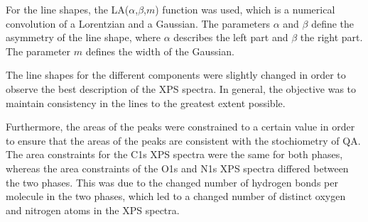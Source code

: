 For the line shapes, the LA($\alpha$,$\beta$,$m$) function was used, which is a numerical convolution of a Lorentzian and a Gaussian. The parameters $\alpha$ and $\beta$ define the asymmetry of the line shape, where $\alpha$ describes the left part and $\beta$ the right part. The parameter $m$ defines the width of the Gaussian.

The line shapes for the different components were slightly changed in order to observe the best description of the \ac{XPS} spectra. In general, the objective was to maintain consistency in the lines to the greatest extent possible.

Furthermore, the areas of the peaks were constrained to a certain value in order to ensure that the areas of the peaks are consistent with the stochiometry of \ac{QA}. The area constraints for the C1s \ac{XPS} spectra were the same for both phases, whereas the area constraints of the O1s and N1s \ac{XPS} spectra differed between the two phases. This was due to the changed number of hydrogen bonds per molecule in the two phases, which led to a changed number of distinct oxygen and nitrogen atoms in the \ac{XPS} spectra.

\cleardoublepage
